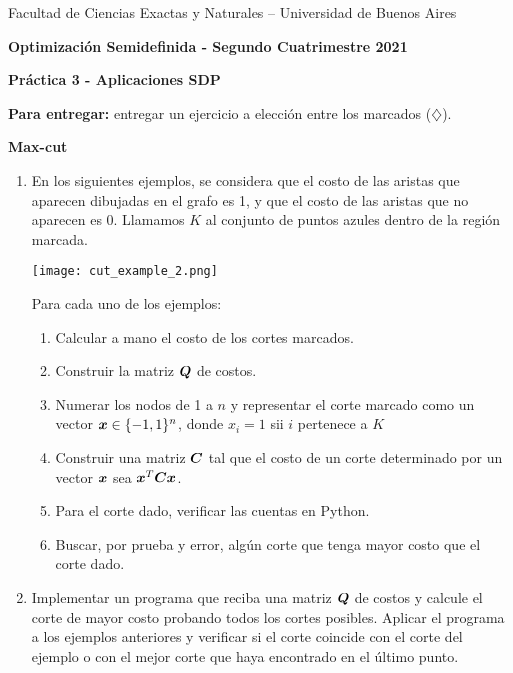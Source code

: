 \documentclass[11pt]{article}
\begin{document}
\begin{center}

{\small Facultad de Ciencias Exactas
y Naturales -- Universidad de Buenos Aires } \vskip 1cm

\textbf{{\large Optimización Semidefinida} - Segundo Cuatrimestre 2021}

\medskip\textbf{Pr\'actica 3 - Aplicaciones SDP}
\end{center}

\medskip

\textbf{Para entregar:} entregar un ejercicio a elección entre los marcados ($\diamondsuit$).

\vspace{0.5cm}

\noindent \textbf{Max-cut}

\begin{enumerate}

\item En los siguientes ejemplos, se considera que el costo de las aristas que aparecen dibujadas en el grafo es 1, y que el costo de las aristas que no aparecen es 0. Llamamos $K$ al conjunto de puntos azules dentro de la región marcada.

\begin{center}
\texttt{[image: cut\_example\_2.png]}
\end{center}

Para cada uno de los ejemplos:

\begin{enumerate}
\item Calcular a mano el costo de los cortes marcados.
\item Construir la matriz $\bm{Q}$ de costos.
\item Numerar los nodos de 1 a $n$ y representar el corte marcado como un vector $\bm{x} \in \{-1, 1\}^n$, donde $x_i=1$ sii $i$ pertenece a $K$
\item Construir una matriz $\bm{C}$ tal que el costo de un corte determinado por un vector $\bm{x}$ sea $\bm{x}^T \bm{C} \bm{x}$.
\item Para el corte dado, verificar las cuentas en Python.
\item Buscar, por prueba y error, algún corte que tenga mayor costo que el corte dado.
\end{enumerate}

\item Implementar un programa que reciba una matriz $\bm{Q}$ de costos y calcule el corte de mayor costo probando todos los cortes posibles. Aplicar el programa a los ejemplos anteriores y verificar si el corte coincide con el corte del ejemplo o con el mejor corte que haya encontrado en el último punto.


\end{enumerate}
\end{document}
